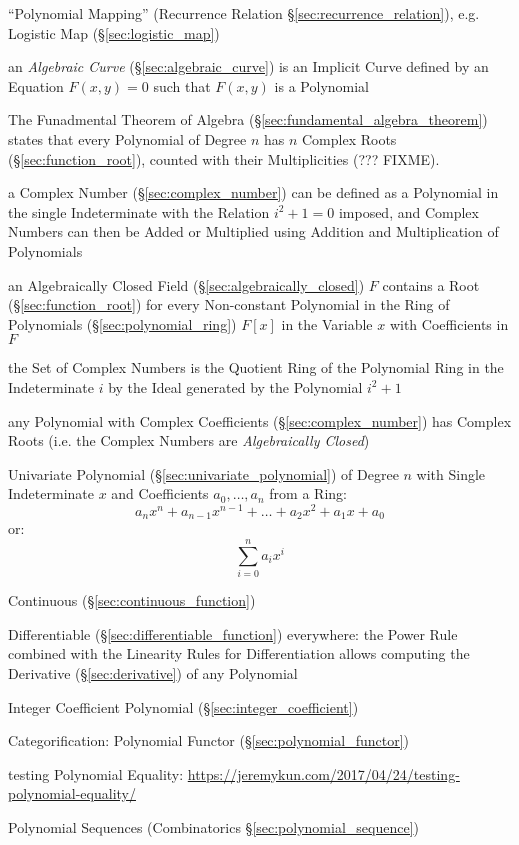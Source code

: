 \fist ``Polynomial Mapping'' (Recurrence Relation
\S\ref{sec:recurrence_relation}), e.g. Logistic Map (\S\ref{sec:logistic_map})

\fist an \emph{Algebraic Curve} (\S\ref{sec:algebraic_curve}) is an Implicit
Curve defined by an Equation $F(x,y) = 0$ such that $F(x,y)$ is a Polynomial

The Funadmental Theorem of Algebra (\S\ref{sec:fundamental_algebra_theorem})
states that every Polynomial of Degree $n$ has $n$ Complex Roots
(\S\ref{sec:function_root}), counted with their Multiplicities (??? FIXME).

a Complex Number (\S\ref{sec:complex_number}) can be defined as a Polynomial in
the single Indeterminate with the Relation $i^2 + 1 = 0$ imposed, and Complex
Numbers can then be Added or Multiplied using Addition and Multiplication of
Polynomials

an Algebraically Closed Field (\S\ref{sec:algebraically_closed}) $F$ contains a
Root (\S\ref{sec:function_root}) for every Non-constant Polynomial in the Ring
of Polynomials (\S\ref{sec:polynomial_ring}) $F[x]$ in the Variable $x$ with
Coefficients in $F$

the Set of Complex Numbers is the Quotient Ring of the Polynomial Ring in the
Indeterminate $i$ by the Ideal generated by the Polynomial $i^2 + 1$

any Polynomial with Complex Coefficients (\S\ref{sec:complex_number}) has
Complex Roots (i.e. the Complex Numbers are \emph{Algebraically Closed})

Univariate Polynomial (\S\ref{sec:univariate_polynomial}) of Degree
$n$ with Single Indeterminate $x$ and Coefficients $a_0, \ldots, a_n$
from a Ring:
\[
  a_n x^n + a_{n-1} x^{n-1} + \ldots + a_2 x^2 + a_1 x + a_0
\]
or:
\[
  \sum_{i=0}^n a_i x^i
\]

Continuous (\S\ref{sec:continuous_function})

Differentiable (\S\ref{sec:differentiable_function}) everywhere: the Power Rule
combined with the Linearity Rules for Differentiation allows computing the
Derivative (\S\ref{sec:derivative}) of any Polynomial

Integer Coefficient Polynomial (\S\ref{sec:integer_coefficient})

Categorification: Polynomial Functor (\S\ref{sec:polynomial_functor})

testing Polynomial Equality:
\url{https://jeremykun.com/2017/04/24/testing-polynomial-equality/}

\fist Polynomial Sequences (Combinatorics \S\ref{sec:polynomial_sequence})

